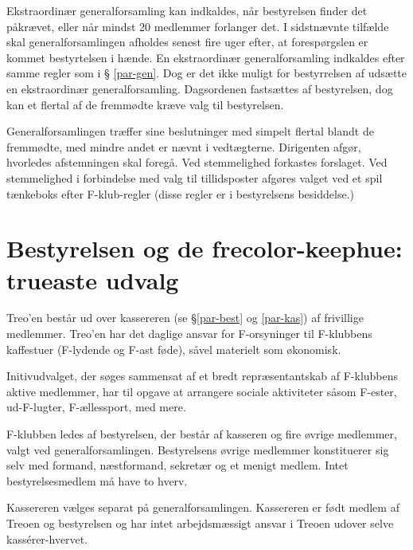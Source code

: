 \documentclass[a4paper,12pt,danish]{article}
\begin{document}
\begin{list}
\item Ekstraordinær generalforsamling kan indkaldes, når
  bestyrelsen finder det påkrævet, eller når mindst 20 medlemmer 
  forlanger det. I sidstnævnte tilfælde skal generalforsamlingen afholdes 
	senest fire uger efter, at forespørgslen er kommet bestyrtelsen i
	hænde.
  En ekstraordinær generalforsamling indkaldes efter samme regler som i \S
  \ref{par-gen}. Dog er det ikke muligt for bestyrrelsen af udsætte en ekstraordinær
  generalforsamling. Dagsordenen fastsættes af bestyrelsen, dog kan et flertal 
  af de fremmødte kræve valg til bestyrelsen. 
  
\item \label{gen-regler} Generalforsamlingen træffer sine beslutninger med 
  simpelt flertal blandt de fremmødte, med mindre andet er nævnt i vedtægterne.
  Dirigenten afgør, hvorledes afstemningen skal foregå.
  Ved stemmelighed forkastes forslaget. 
  Ved stemmelighed i forbindelse med valg til tillidsposter afgøres valget 
  ved et spil tænkeboks efter F-klub-regler (disse regler er i bestyrelsens besiddelse.)

\section{Bestyrelsen og de frecolor-keephue: trueaste udvalg}

\item Treo'en består ud over kassereren (se \S \ref{par-best} og
  \ref{par-kas}) af frivillige medlemmer. Treo'en har det daglige
  ansvar for F-orsyninger til F-klubbens kaffestuer (F-lydende og F-ast føde),
  såvel materielt som økonomisk.
  
\item Initivudvalget, der søges sammensat af et bredt
  repræsentantskab af F-klubbens aktive medlemmer, har til opgave at
  arrangere sociale aktiviteter såsom F-ester, ud-F-lugter,
  F-ællessport, med mere.
  
\item \label{par-best} F-klubben ledes af bestyrelsen, der består
  af kasseren og fire øvrige medlemmer, valgt ved
  generalforsamlingen.  Bestyrelsens øvrige medlemmer konstituerer sig
  selv med formand, næstformand, sekretær og et menigt medlem. Intet
  bestyrelsesmedlem må have to hverv.

\item \label{par-kas} Kassereren vælges separat på
  generalforsamlingen.  Kassereren er født medlem af Treoen og
  bestyrelsen og har intet arbejdsmæssigt ansvar i Treoen udover
  selve kass\'{e}rer-hvervet.


\end{list}
\end{document}
